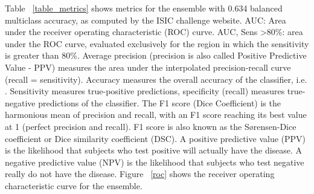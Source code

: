 \documentclass[journal]{IEEEtran}
\begin{document}
Table ~\ref{table_metrics} shows metrics for the ensemble with 0.634 balanced multiclass accuracy, as computed by the ISIC challenge website. AUC: Area under the receiver operating characteristic (ROC) curve. AUC, Sens \textgreater 80\%: area under the ROC curve, evaluated exclusively for the region in which the sensitivity is greater than 80\%. Average precision (precision is also called Positive Predictive Value - PPV) measures the area under the interpolated precision-recall curve (recall = sensitivity). Accuracy measures the overall accuracy of the classifier, i.e.
.
Sensitivity measures true-positive predictions, specificity (recall) measures true-negative predictions of the classifier. The F1 score (Dice Coefficient) is the harmonious mean of precision and recall, with an F1 score reaching its best value at 1 (perfect precision and recall). F1 score is also known as the Sørensen-Dice coefficient or Dice similarity coefficient (DSC). A positive predictive value (PPV) is the likelihood that subjects who test positive will actually have the disease. A negative predictive value (NPV) is the likelihood that subjects who test negative really do not have the disease. Figure ~\ref{roc} shows the receiver operating characteristic curve for the ensemble.
\end{document}
